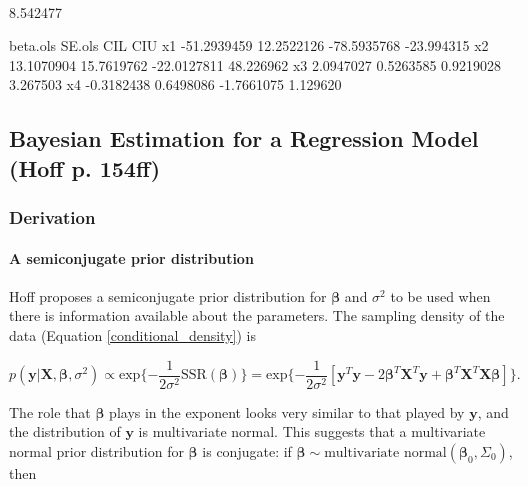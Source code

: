 \documentclass[12pt, a4paper]{article}
\begin{document}
\hrulefill \\

\begin{Schunk}
\begin{Soutput}
[1] 8.542477
\end{Soutput}
\begin{Soutput}
      beta.ols     SE.ols         CIL        CIU
x1 -51.2939459 12.2522126 -78.5935768 -23.994315
x2  13.1070904 15.7619762 -22.0127811  48.226962
x3   2.0947027  0.5263585   0.9219028   3.267503
x4  -0.3182438  0.6498086  -1.7661075   1.129620
\end{Soutput}
\end{Schunk}



\clearpage

  \subsection{Bayesian Estimation for a Regression Model (Hoff p. 154ff)}

  \subsubsection{Derivation}

    \paragraph{A semiconjugate prior distribution}\label{normRegSemiconjugatePrior}
    Hoff proposes a semiconjugate prior distribution for $\boldsymbol\beta$ and $\sigma^2$ to be used when there is information available about the parameters.  The sampling density of the data (Equation \ref{conditional_density}) is

    $$p(\mathbf{y}|\mathbf{X},\boldsymbol\beta,\sigma^2) \propto \text{exp}\{-\frac{1}{2\sigma^2}\text{SSR}(\boldsymbol\beta)\} = \text{exp}\{-\frac{1}{2\sigma^2}[\mathbf{y}^T\mathbf{y} - 2\boldsymbol\beta^T\mathbf{X}^T\mathbf{y}+\boldsymbol\beta^T\mathbf{X}^T\mathbf{X}\boldsymbol\beta]\}.$$

    The role that $\boldsymbol\beta$ plays in the exponent looks very similar to that played by $\mathbf{y}$, and the distribution of $\mathbf{y}$ is multivariate normal.  This suggests that a multivariate normal prior distribution for $\boldsymbol\beta$ is conjugate:  if $\boldsymbol\beta \sim \text{multivariate normal}(\boldsymbol\beta_0,\Sigma_0)$, then
\end{document}
